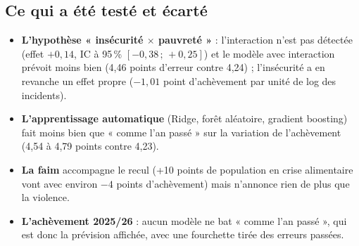 \documentclass[11pt,a4paper]{article}
\begin{document}
\subsection{Ce qui a été testé et écarté}
\begin{itemize}
\item \textbf{L'hypothèse « insécurité $\times$ pauvreté »} : l'interaction n'est pas détectée (effet $+0{,}14$, IC à 95\,\% $[-0{,}38\,;\,+0{,}25]$) et le modèle avec interaction prévoit moins bien (4,46 points d'erreur contre 4,24) ; l'insécurité a en revanche un effet propre ($-1{,}01$ point d'achèvement par unité de log des incidents).
\item \textbf{L'apprentissage automatique} (Ridge, forêt aléatoire, gradient boosting) fait moins bien que « comme l'an passé » sur la variation de l'achèvement (4,54 à 4,79 points contre 4,23).
\item \textbf{La faim} accompagne le recul (+10 points de population en crise alimentaire vont avec environ $-4$ points d'achèvement) mais n'annonce rien de plus que la violence.
\item \textbf{L'achèvement 2025/26} : aucun modèle ne bat « comme l'an passé », qui est donc la prévision affichée, avec une fourchette tirée des erreurs passées.
\end{itemize}
\end{document}
